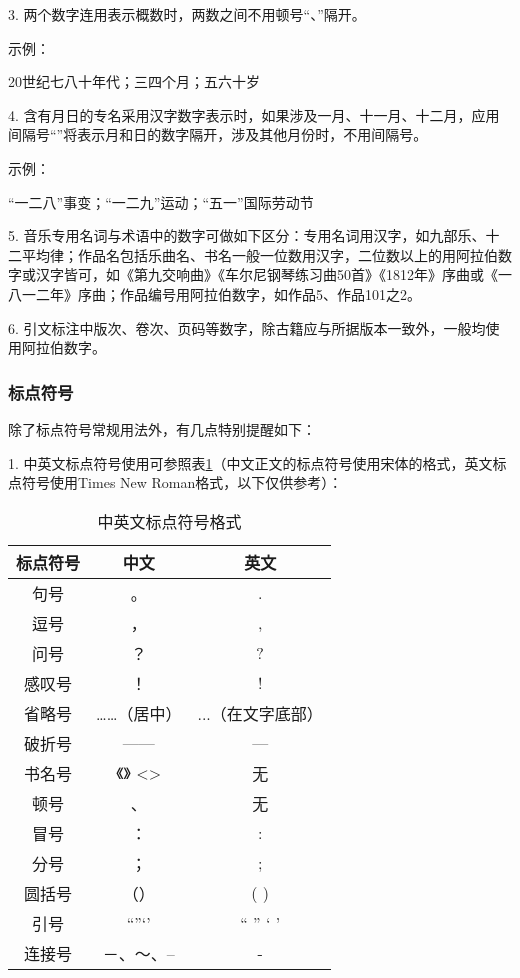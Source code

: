 3. 两个数字连用表示概数时，两数之间不用顿号“、”隔开。

示例：

20世纪七八十年代；三四个月；五六十岁

4. 含有月日的专名采用汉字数字表示时，如果涉及一月、十一月、十二月，应用间隔号“\bullet”将表示月和日的数字隔开，涉及其他月份时，不用间隔号。

示例：

“一\bullet 二八”事变；“一二\bullet 九”运动；“五一”国际劳动节

5. 音乐专用名词与术语中的数字可做如下区分：专用名词用汉字，如九部乐、十二平均律；作品名包括乐曲名、书名一般一位数用汉字，二位数以上的用阿拉伯数字或汉字皆可，如《第九交响曲》《车尔尼钢琴练习曲50首》《1812年》序曲或《一八一二年》序曲；作品编号用阿拉伯数字，如作品5、作品101之2。

6. 引文标注中版次、卷次、页码等数字，除古籍应与所据版本一致外，一般均使用阿拉伯数字。

\subsubsection{标点符号}

除了标点符号常规用法外，有几点特别提醒如下：

1. 中英文标点符号使用可参照表\ref{tab:symbol}（中文正文的标点符号使用宋体的格式，英文标点符号使用Times New Roman格式，以下仅供参考）：

\begin{table}
	\centering
	\caption{中英文标点符号格式}
	\begin{tabular}{ccc}
		\toprule
		标点符号 & 中文 & 英文 \\
		\midrule
		句号 & 。& . \\
		逗号 & ，& , \\
		问号 & ？& ? \\
		感叹号 & ！&!\\
		省略号 & ……（居中）&...（在文字底部）\\
		破折号 & —— & —\\
		书名号 &《》 <> & 无 \\
		顿号 & 、& 无 \\
		冒号 & ：& : \\
		分号 & ；& ; \\
		圆括号 &（）& ( ) \\
		引号 & “”‘’ & “ ” ‘ ’\\
		连接号 & －、～、– & -\\
		\bottomrule
	\end{tabular}
	\label{tab:symbol}
\end{table}

